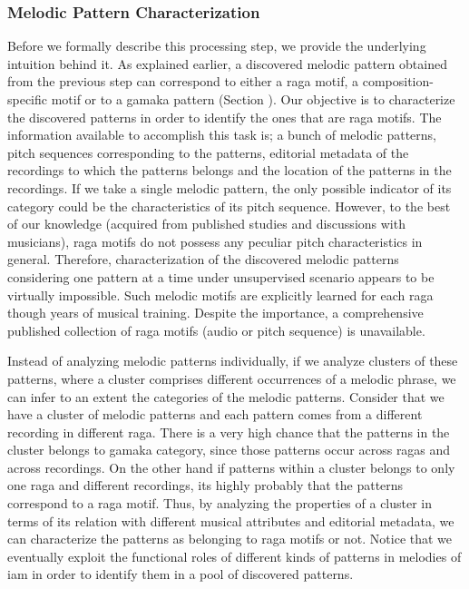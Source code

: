 {\subsubsection{Melodic Pattern Characterization}
\label{pattern_characterization}

Before we formally describe this processing step, we provide the underlying intuition behind it. As explained earlier, a discovered melodic pattern obtained from the previous step can correspond to either a \gls{raga} motif, a composition-specific motif or to a \gls{gamaka} pattern (Section ). Our objective is to characterize the discovered patterns in order to identify the ones that are \gls{raga} motifs. The information available to accomplish this task is; a bunch of melodic patterns, pitch sequences corresponding to the patterns, editorial metadata of the recordings to which the patterns belongs and the location of the patterns in the recordings. If we take a single melodic pattern, the only possible indicator of its category could be the characteristics of its pitch sequence. However, to the best of our knowledge (acquired from published studies and discussions with musicians), \gls{raga} motifs do not possess any peculiar pitch characteristics in general. Therefore, characterization of the discovered melodic patterns considering one pattern at a time under unsupervised scenario appears to be virtually impossible. Such melodic motifs are explicitly learned for each \gls{raga} though years of musical training. Despite the importance, a comprehensive published collection of \gls{raga} motifs (audio or pitch sequence) is unavailable. 

Instead of analyzing melodic patterns individually, if we analyze clusters of these patterns, where a cluster comprises different occurrences of a melodic phrase, we can infer to an extent the categories of the melodic patterns. Consider that we have a cluster of melodic patterns and each pattern comes from a different recording in different \gls{raga}. There is a very high chance that the patterns in the cluster belongs to \gls{gamaka} category, since those patterns occur across \glspl{raga} and across recordings. On the other hand if patterns within a cluster belongs to only one \gls{raga} and different recordings, its highly probably that the patterns correspond to a \gls{raga} motif. Thus, by analyzing the properties of a cluster in terms of its relation with different musical attributes and editorial metadata, we can characterize the patterns as belonging to \gls{raga} motifs or not. Notice that we eventually exploit the functional roles of different kinds of patterns in melodies of \gls{iam} in order to identify them in a pool of discovered patterns. 

}
